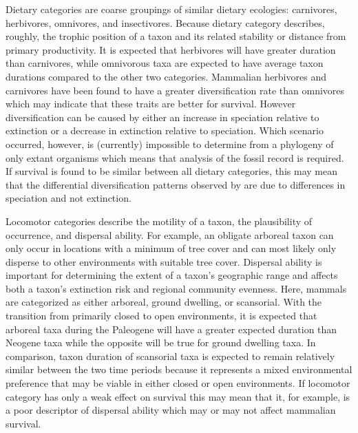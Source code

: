 \documentclass[11pt,letterpaper]{article}
\begin{document}
Dietary categories are coarse groupings of similar dietary ecologies: carnivores, herbivores, omnivores, and insectivores. Because dietary category describes, roughly, the trophic position of a taxon and its related stability or distance from primary productivity. It is expected that herbivores will have greater duration than carnivores, while omnivorous taxa are expected to have average taxon durations compared to the other two categories. Mammalian herbivores and carnivores have been found to have a greater diversification rate than omnivores \citep{Price2012} which may indicate that these traits are better for survival. However diversification can be caused by either an increase in speciation relative to extinction or a decrease in extinction relative to speciation. Which scenario occurred, however, is (currently) impossible to determine from a phylogeny of only extant organisms \citep{Rabosky2010a} which means that analysis of the fossil record is required. If survival is found to be similar between all dietary categories, this may mean that the differential diversification patterns observed by \citet{Price2012} are due to differences in speciation and not extinction. 

Locomotor categories describe the motility of a taxon, the plausibility of occurrence, and dispersal ability. For example, an obligate arboreal taxon can only occur in locations with a minimum of tree cover and can most likely only disperse to other environments with suitable tree cover. Dispersal ability is important for determining the extent of a taxon's geographic range \citep{Birand2012,Jablonski2006a,Gaston2009} and affects both a taxon's extinction risk and regional community evenness. Here, mammals are categorized as either arboreal, ground dwelling, or scansorial. With the transition from primarily closed to open environments, it is expected that arboreal taxa during the Paleogene will have a greater expected duration than Neogene taxa while the opposite will be true for ground dwelling taxa. In comparison, taxon duration of scansorial taxa is expected to remain relatively similar between the two time periods because it represents a mixed environmental preference that may be viable in either closed or open environments. If locomotor category has only a weak effect on survival this may mean that it, for example, is a poor descriptor of dispersal ability which may or may not affect mammalian survival. 
\end{document}
